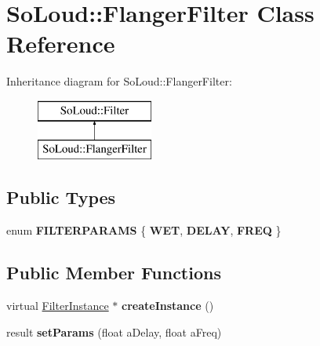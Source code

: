 \hypertarget{class_so_loud_1_1_flanger_filter}{}\section{So\+Loud\+:\+:Flanger\+Filter Class Reference}
\label{class_so_loud_1_1_flanger_filter}
Inheritance diagram for So\+Loud\+:\+:Flanger\+Filter\+:\begin{figure}[H]
\begin{center}
\leavevmode
\includegraphics[height=2.000000cm]{class_so_loud_1_1_flanger_filter}
\end{center}
\end{figure}
\subsection*{Public Types}
\begin{DoxyCompactItemize}
\item 
\mbox{\label{class_so_loud_1_1_flanger_filter_a0016bc09925e106d4de01686892a8eb7}} 
enum {\bfseries F\+I\+L\+T\+E\+R\+P\+A\+R\+A\+MS} \{ {\bfseries W\+ET}, 
{\bfseries D\+E\+L\+AY}, 
{\bfseries F\+R\+EQ}
 \}
\end{DoxyCompactItemize}
\subsection*{Public Member Functions}
\begin{DoxyCompactItemize}
\item 
\mbox{\label{class_so_loud_1_1_flanger_filter_a7abf8a3b961902b84d7b634826c83a10}} 
virtual \mbox{\hyperlink{class_so_loud_1_1_filter_instance}{Filter\+Instance}} $\ast$ {\bfseries create\+Instance} ()
\item 
\mbox{\label{class_so_loud_1_1_flanger_filter_aa483de45fd8458b9365b9012e83c0bd3}} 
result {\bfseries set\+Params} (float a\+Delay, float a\+Freq)
\end{DoxyCompactItemize}

